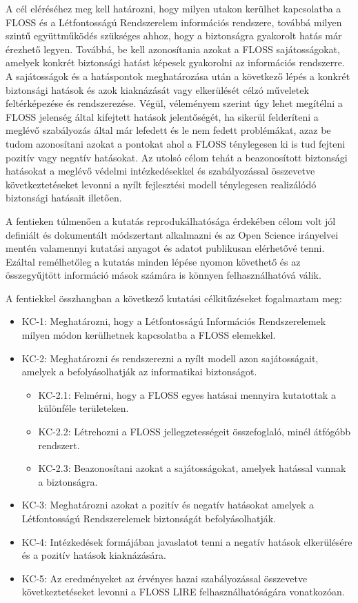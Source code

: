 \documentclass[12pt,magyar,a4paper,oneside]{scrreprt}
\providecommand{\tightlist}{%
  \setlength{\itemsep}{0pt}\setlength{\parskip}{0pt}}
\begin{document}
A cél eléréséhez meg kell határozni, hogy milyen utakon kerülhet
kapcsolatba a FLOSS és a Létfontosságú Rendszerelem információs
rendszere, továbbá milyen szintű együttműködés szükséges ahhoz, hogy a
biztonságra gyakorolt hatás már érezhető legyen. Továbbá, be kell
azonosítania azokat a FLOSS sajátosságokat, amelyek konkrét biztonsági
hatást képesek gyakorolni az információs rendszerre. A sajátosságok és a
hatáspontok meghatározása után a következő lépés a konkrét biztonsági
hatások és azok kiaknázását vagy elkerülését célzó műveletek
feltérképezése és rendszerezése. Végül, véleményem szerint úgy lehet
megítélni a FLOSS jelenség által kifejtett hatások jelentőségét, ha
sikerül felderíteni a meglévő szabályozás által már lefedett és le nem
fedett problémákat, azaz be tudom azonosítani azokat a pontokat ahol a
FLOSS ténylegesen ki is tud fejteni pozitív vagy negatív hatásokat. Az
utolsó célom tehát a beazonosított biztonsági hatásokat a meglévő
védelmi intézkedésekkel és szabályozással összevetve következtetéseket
levonni a nyílt fejlesztési modell ténylegesen realizálódó biztonsági
hatásait illetően.

A fentieken túlmenően a kutatás reprodukálhatósága érdekében célom volt
jól definiált és dokumentált módszertant alkalmazni és az Open Science
irányelvei mentén valamennyi kutatási anyagot és adatot publikusan
elérhetővé tenni. Ezáltal remélhetőleg a kutatás minden lépése nyomon
követhető és az összegyűjtött információ mások számára is könnyen
felhasználhatóvá válik.

A fentiekkel összhangban a következő kutatási célkitűzéseket fogalmaztam
meg:

\begin{itemize}
\item
  KC-1: Meghatározni, hogy a Létfontosságú Információs Rendszerelemek
  milyen módon kerülhetnek kapcsolatba a FLOSS elemekkel.
\item
  KC-2: Meghatározni és rendszerezni a nyílt modell azon sajátosságait,
  amelyek a befolyásolhatják az informatikai biztonságot.

  \begin{itemize}
  \tightlist
  \item
    KC-2.1: Felmérni, hogy a FLOSS egyes hatásai mennyira kutatottak a
    különféle területeken.
  \item
    KC-2.2: Létrehozni a FLOSS jellegzetességeit összefoglaló, minél
    átfógóbb rendszert.
  \item
    KC-2.3: Beazonosítani azokat a sajátosságokat, amelyek hatással
    vannak a biztonságra.
  \end{itemize}
\item
  KC-3: Meghatározni azokat a pozitív és negatív hatásokat amelyek a
  Létfontosságú Rendszerelemek biztonságát befolyásolhatják.
\item
  KC-4: Intézkedések formájában javaslatot tenni a negatív hatások
  elkerülésére és a pozitív hatások kiaknázására.
\item
  KC-5: Az eredményeket az érvényes hazai szabályozással összevetve
  következtetéseket levonni a FLOSS LIRE felhasználhatóságára
  vonatkozóan.
\end{itemize}
\end{document}
